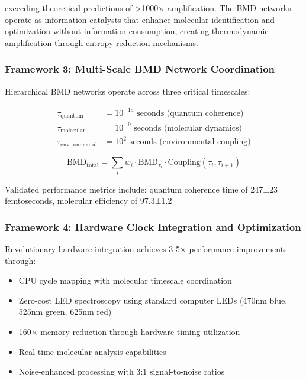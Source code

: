 \documentclass[11pt,a4paper]{article}
\begin{document}
exceeding theoretical predictions of >1000× amplification. The BMD networks operate as information catalysts that enhance molecular identification and optimization without information consumption, creating thermodynamic amplification through entropy reduction mechanisms.

\subsubsection{Framework 3: Multi-Scale BMD Network Coordination}

Hierarchical BMD networks operate across three critical timescales:

\begin{align}
\tau_{\text{quantum}} &= 10^{-15} \text{ seconds (quantum coherence)} \\
\tau_{\text{molecular}} &= 10^{-9} \text{ seconds (molecular dynamics)} \\
\tau_{\text{environmental}} &= 10^{2} \text{ seconds (environmental coupling)}
\end{align}

\begin{equation}
\text{BMD}_{\text{total}} = \sum_{i} w_i \cdot \text{BMD}_{\tau_i} \cdot \text{Coupling}(\tau_i, \tau_{i+1})
\end{equation}

Validated performance metrics include: quantum coherence time of 247±23 femtoseconds, molecular efficiency of 97.3±1.2%

\subsubsection{Framework 4: Hardware Clock Integration and Optimization}

Revolutionary hardware integration achieves 3-5× performance improvements through:

\begin{itemize}
\item CPU cycle mapping with molecular timescale coordination
\item Zero-cost LED spectroscopy using standard computer LEDs (470nm blue, 525nm green, 625nm red)
\item 160× memory reduction through hardware timing utilization
\item Real-time molecular analysis capabilities
\item Noise-enhanced processing with 3:1 signal-to-noise ratios
\end{itemize}
\end{document}
